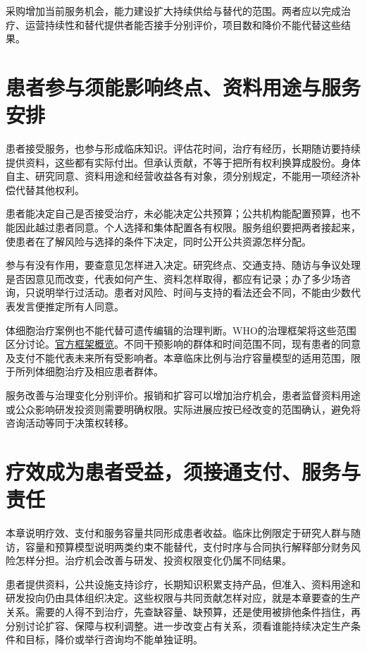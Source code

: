 \documentclass[UTF8,fontset=windows,12pt,a4paper,oneside,openany]{ctexbook}
\begin{document}
采购增加当前服务机会，能力建设扩大持续供给与替代的范围。两者应以完成治疗、运营持续性和替代提供者能否接手分别评价，项目数和降价不能代替这些结果。

\section{患者参与须能影响终点、资料用途与服务安排}

患者接受服务，也参与形成临床知识。评估花时间，治疗有经历，长期随访要持续提供资料，这些都有实际付出。但承认贡献，不等于把所有权利换算成股份。身体自主、研究同意、资料用途和经营收益各有对象，须分别规定，不能用一项经济补偿代替其他权利。

患者能决定自己是否接受治疗，未必能决定公共预算；公共机构能配置预算，也不能因此越过患者同意。个人选择和集体配置各有权限。服务组织要把两者接起来，使患者在了解风险与选择的条件下决定，同时公开公共资源怎样分配。

参与有没有作用，要查意见怎样进入决定。研究终点、交通支持、随访与争议处理是否因意见而改变，代表如何产生、资料怎样取得，都应有记录；办了多少场咨询，只说明举行过活动。患者对风险、时间与支持的看法还会不同，不能由少数代表发言便推定所有人同意。

体细胞治疗案例也不能代替可遗传编辑的治理判断。WHO的治理框架将这些范围区分讨论。\href{https://www.who.int/publications/i/item/9789240030060}{官方框架概览}。不同干预影响的群体和时间范围不同，现有患者的同意及支付不能代表未来所有受影响者。本章临床比例与治疗容量模型的适用范围，限于所列体细胞治疗及相应患者群体。

服务改善与治理变化分别评价。报销和扩容可以增加治疗机会，患者监督资料用途或公众影响研发投资则需要明确权限。实际进展应按已经改变的范围确认，避免将咨询活动等同于决策权转移。

\section{疗效成为患者受益，须接通支付、服务与责任}

本章说明疗效、支付和服务容量共同形成患者收益。临床比例限定于研究人群与随访，容量和预算模型说明两类约束不能替代，支付时序与合同执行解释部分财务风险怎样分担。治疗机会改善与研发、投资权限变化仍属不同结果。



患者提供资料，公共设施支持诊疗，长期知识积累支持产品，但准入、资料用途和研发投向仍由具体组织决定。这些权限与共同贡献怎样对应，就是本章要查的生产关系。需要的人得不到治疗，先查缺容量、缺预算，还是使用被排他条件挡住，再分别讨论扩容、保障与权利调整。进一步改变占有关系，须看谁能持续决定生产条件和目标，降价或举行咨询均不能单独证明。
\end{document}
